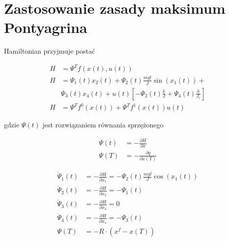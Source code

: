 \documentclass[11pt]{mwart}
\begin{document}
\section{Zastosowanie zasady maksimum Pontyagrina}

Hamiltonian przyjmuje postać

\begin{equation}
	\label{eq-ham}
	\begin{split}
		H &= \Psi^Tf\left(x\left(t\right),u\left(t\right)\right) \\
		H &= \Psi_{1}\left(t\right)x_{2}\left(t\right) + 
		\Psi_{2}\left(t\right)\frac{mgl}{J}\sin\left(x_{1}\left(t\right)\right) +\\
		& \Psi_{3}\left(t\right)x_{4}\left(t\right) +
		u\left(t\right)\left[-\Psi_{2}\left(t\right)\frac{k}{J}+\Psi_{4}\left(t\right)\frac{k}{J_{r}}\right] \\
		H &= \Psi^Tf^0\left(x\left(t\right)\right)+\Psi^Tf^1\left(x\left(t\right)\right)u\left(t\right)
	\end{split}
\end{equation}

gdzie $\Psi\left(t\right)$ jest rozwiązaniem równania sprzężonego

\begin{equation}
	\label{eq-rowsprz}
	\begin{split}
		\dot{\Psi}\left(t\right) &= -\frac{\partial H}{\partial x} \\
		\Psi\left(T\right) &= -\frac{\partial q}{\partial x\left(T\right)}
	\end{split}
\end{equation}

\begin{equation}
	\label{eq-rowsprz1}
	\begin{split}
		\dot{\Psi}_{1}\left(t\right) &= -\frac{\partial H}{\partial x_{1}} = -\Psi_{2}\left(t\right)\frac{mgl}{J}\cos\left(x_{1}\left(t\right)\right) \\
		\dot{\Psi}_{2}\left(t\right) &= -\frac{\partial H}{\partial x_{2}} = -\Psi_{1}\left(t\right) \\
		\dot{\Psi}_{3}\left(t\right) &= -\frac{\partial H}{\partial x_{3}} = 0 \\
		\dot{\Psi}_{4}\left(t\right) &= -\frac{\partial H}{\partial x_{4}} = -\Psi_{3}\left(t\right) \\
		\Psi\left(T\right) &= -R\cdot\left(x^f-x\left(T\right)\right)
	\end{split}
\end{equation}
\end{document}
